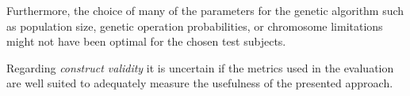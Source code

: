 Furthermore, the choice of many of the parameters for the genetic algorithm such as population size,
genetic operation probabilities, or chromosome limitations might not have been optimal for the chosen test
subjects.

Regarding \emph{construct validity} it is uncertain if the metrics used in the evaluation are well suited
to adequately measure the usefulness of the presented approach.
 
